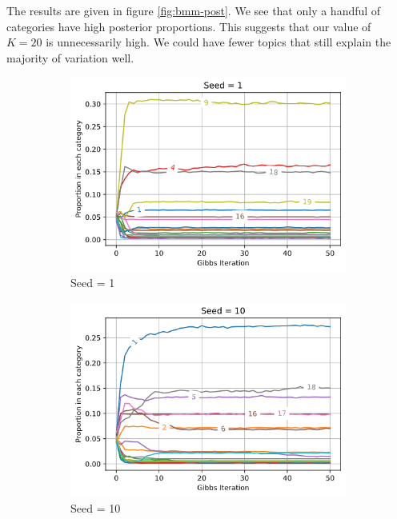 \documentclass[]{article}
\begin{document}
The results are given in figure \ref{fig:bmm-post}. We see that only a handful of categories have high posterior proportions. This suggests that our value of $K=20$ is unnecessarily high. We could have fewer topics that still explain the majority of variation well.
%
\begin{figure}[!h]
	\begin{subfigure}{0.33\linewidth}
		\centering
		\includegraphics[width=\linewidth]{gibbs-posterior-1.png}
		\caption{Seed = 1}	
	\end{subfigure}
	\begin{subfigure}{0.33\linewidth}
		\centering
		\includegraphics[width=\linewidth]{gibbs-posterior-2.png}
		\caption{Seed =	10}
	\end{subfigure}
	\begin{subfigure}{0.33\linewidth}

\end{subfigure}
\end{figure}
\end{document}
